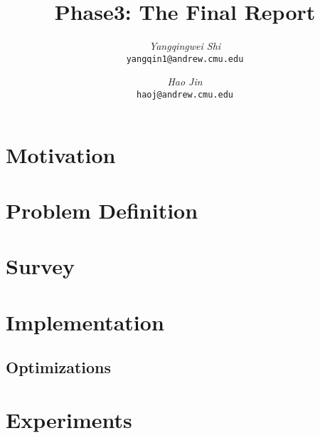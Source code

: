 \documentclass[12pt]{article}
\begin{document}
\newcommand{\beq}{\begin{equation}}
\newcommand{\eeq}{\end{equation}}
\newcommand{\bit}{\begin{itemize*}}
\newcommand{\eit}{\end{itemize*}}
\newcommand{\goal}[1]{ {\noindent {$\Rightarrow$} \em {#1} } }
\newcommand{\hide}[1]{}
\newcommand{\comment}[1]{ {\footnotesize {#1} } }
\newtheorem{lemma}{Lemma}
\newtheorem{theorem}{Theorem}
\newtheorem{proof}{Proof}
\newtheorem{defn}{Definition}
\newtheorem{algo}{Algorithm}
\newtheorem{observation}{Observation}

\title{Phase3: The Final Report}


\author{ {\em Yangqingwei Shi} \\	   
	    {\tt yangqin1@andrew.cmu.edu}
	 \and
	 {\em Hao Jin} \\
	     {\tt haoj@andrew.cmu.edu}}
\maketitle

\section{Motivation}
    \label{sec:intro}
    
\newpage
\section{Problem Definition}
    \label{sec:problem}
    
\newpage
\section{Survey}
    \label{sec:survey}
    
	   
\newpage
\section{Implementation}
\subsection{Optimizations}
	\label{sec:imp}
	

\newpage
\paragraph{}
\newpage
\section{Experiments}
\end{document}
